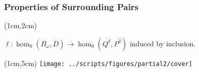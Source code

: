 \begin{frame}
  \frametitle{Properties of Surrounding Pairs}



  \begin{textblock*}{11cm}(1cm,2cm)\begin{small}

    $\ell : \hom_0(\overline{B_\omega}, \overline{D})\to \hom_0(\overline{Q^\delta}, \overline{P^\delta})$ induced by inclusion.\vspace{1ex}

  \end{small}\end{textblock*}

  \begin{textblock*}{10cm}(1cm,5cm)
    \texttt{[image: ../scripts/figures/partial2/cover]}
  \end{textblock*}
\end{frame}

